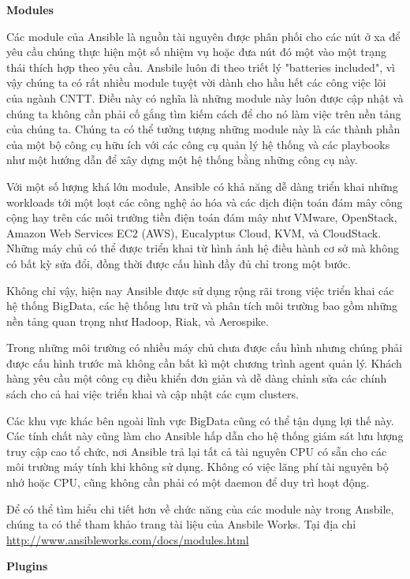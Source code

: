 \textbf{\large Modules}


Các module của Ansible là nguồn tài nguyên được phân phối cho các nút ở xa để yêu cầu chúng thực hiện một số nhiệm vụ hoặc đưa nút đó một vào một trạng thái thích hợp theo yêu cầu. Ansbile luôn đi theo triết lý "batteries included", vì vậy chúng ta có rất nhiều module tuyệt vời dành cho hầu hết các công việc lõi của ngành CNTT. Điều này có nghĩa là những module này luôn được cập nhật và chúng ta không cần phải cố gắng tìm kiếm cách để cho nó làm việc trên nền tảng của chúng ta. Chúng ta có thể tưởng tượng những module này là các thành phần của một bộ công cụ hữu ích với các công cụ quản lý hệ thống và các playbooks như một hướng dẫn để xây dựng một hệ thống bằng những công cụ này.

Với một số lượng khá lớn module, Ansible có khả năng dễ dàng triển khai những workloads tới một loạt các công nghệ ảo hóa và các dịch điện toán đám mây công cộng hay trên các môi trường tiền điện toán đám mây như VMware, OpenStack, Amazon Web Services EC2 (AWS), Eucalyptus Cloud, KVM, và CloudStack. Những máy chủ có thể được triển khai từ hình ảnh hệ điều hành cơ sở mà không có bất kỳ sửa đổi, đồng thời được cấu hình đầy đủ chỉ trong một bước.

Không chỉ vậy, hiện nay Ansible được sử dụng rộng rãi trong việc triển khai các hệ thống BigData, các hệ thống lưu trữ và phân tích môi trường bao gồm những nền tảng quan trọng như Hadoop, Riak, và Aerospike.

Trong những môi trường có nhiều máy chủ chưa được cấu hình nhưng chúng phải được cấu hình trước mà không cần bất kì một chương trình agent quản lý. Khách hàng yêu cầu một công cụ điều khiển đơn giản và dễ dàng chỉnh sửa các chính sách cho cả hai việc triển khai và cập nhật các cụm clusters.

Các khu vực khác bên ngoài lĩnh vực BigData cũng có thể tận dụng lợi thế này. Các tính chất này cũng làm cho Ansible hấp dẫn cho hệ thống giám sát lưu lượng truy cập cao tổ chức, nơi Ansible trả lại tất cả tài nguyên CPU có sẵn cho các môi trường máy tính khi không sử dụng. Không có việc lãng phí tài nguyên bộ nhớ hoặc CPU, cũng không cần phải có một daemon để duy trì hoạt động.

Để có thể tìm hiểu chi tiết hơn về chức năng của các module này trong Ansbile, chúng ta có thể tham khảo trang tài liệu của Ansbile Works. Tại địa chỉ \url{http://www.ansibleworks.com/docs/modules.html}

\textbf{\large Plugins}



